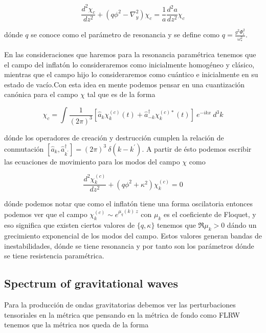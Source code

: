 \begin{equation}
    \frac{d^2 \chi_c}{dz^2} + (q \phi^2 - \nabla_y^2) \chi_c = \frac{1}{a} \frac{d^2 a}{d z^2} \chi_c 
\end{equation}

\noindent
dónde $q$ se conoce como el parámetro de resonancia y se define como $\displaystyle q = \frac{g^2 \Phi_i^2}{\omega_*^2}$.

En las consideraciones que haremos para la resonancia paramétrica tenemos que el campo del inflatón lo consideraremos como inicialmente homogéneo y clásico, mientras que el campo hijo lo consideraremos como cuántico e inicialmente en su estado de vacío.Con esta idea en mente podemos pensar en una cuantización canónica para el campo $\chi$ tal que es de la forma

\begin{equation}
    \chi_c = \int \frac{1}{(2 \pi)^3} \left[ \hat{a}_k \chi^{(c)}_k (t) + \hat{a}^\dagger_{-k} \chi^{(c) *}_k (t) \right] ~ e^{- i k x} ~ d^3 k
\end{equation}

\noindent
dónde los operadores de creación y destrucción cumplen la relación de conmutación $\displaystyle \left[ \hat{a}_{k}, \hat{a}_{k^\prime}^\dagger \right] = (2\pi)^3 ~ \delta (k - k^\prime)$. A partir de ésto podemos escribir las ecuaciones de movimiento para los modos del campo $\chi$ como

\begin{equation}
    \frac{d^2 \chi_k^{(c)}}{dz^2} + \left( q \phi^2 + \kappa^2 \right) \chi_k^{(c)} = 0 
\end{equation}

\noindent
dónde podemos notar que como el inflatón tiene una forma oscilatoria entonces podemos ver que el campo $\chi_k^{(c)} \sim e^{\mu_q (k) ~ z}$ con $\mu_k$ es el coeficiente de Floquet, y eso significa que existen ciertos valores de $\{ q, \kappa \}$ tenemos que $\Re{\mu_k} > 0$ dándo un grecimiento exponencial de los modos del campo. Estos valores generan bandas de inestabilidades, dónde se tiene resonancia y por tanto son los parámetros dónde se tiene resistencia paramétrica. 

\subsection{Spectrum of gravitational waves}

Para la producción de ondas gravitatorias debemos ver las perturbaciones tensoriales en la métrica que pensando en la métrica de fondo como FLRW tenemos que la métrica nos queda de la forma

